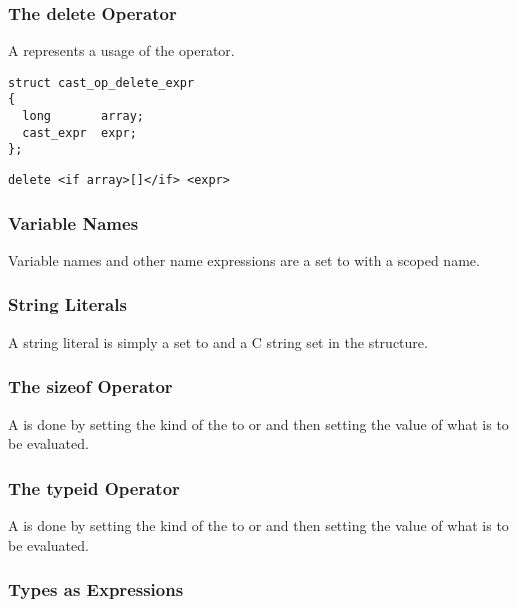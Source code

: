 \subsubsection{The delete Operator}

A  represents a usage of the 
operator.

\begin{verbatim}
struct cast_op_delete_expr
{
  long       array;
  cast_expr  expr;
};
\end{verbatim}

\begin{verbatim}
delete <if array>[]</if> <expr>
\end{verbatim}

\subsubsection{Variable Names}

Variable names and other name expressions are a  set to
 with a scoped name.

\subsubsection{String Literals}

A string literal is simply a  set to
 and a C string set in the 
structure.

\subsubsection{The sizeof Operator}

A  is done by setting the kind of the  to
 or  and
then setting the value of what is to be evaluated.

\subsubsection{The typeid Operator}

A  is done by setting the kind of the  to
 or  and
then setting the value of what is to be evaluated.

\subsubsection{Types as Expressions}

